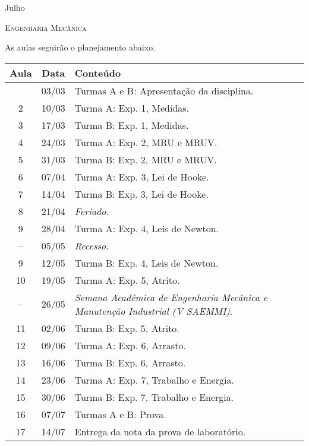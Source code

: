 \begin{marginfigure}
\centering
Julho\\
\end{marginfigure}
\vspace{1cm}
\begin{center}
\Large\textsc{Engenharia Mecânica}
\end{center}

As aulas seguirão o planejamento abaixo.
\begin{center}
\begin{longtable}{ccp{70mm}}
\toprule
Aula & Data & Conteúdo \\
\midrule
\endhead
\bottomrule
\endfoot
 1 & 03/03 & Turmas A e B: Apresentação da disciplina. \\
 2 & 10/03 & Turma A: Exp. 1, Medidas. \\
 3 & 17/03 & Turma B: Exp. 1, Medidas. \\
 4 & 24/03 & Turma A: Exp. 2, MRU e MRUV. \\ 
 5 & 31/03 & Turma B: Exp. 2, MRU e MRUV. \\
 6 & 07/04 & Turma A: Exp. 3, Lei de Hooke. \\
 7 & 14/04 & Turma B: Exp. 3, Lei de Hooke. \\
 8 & 21/04 & \emph{Feriado}. \\
 9 & 28/04 & Turma A: Exp. 4, Leis de Newton. \\
-- & 05/05 & \emph{Recesso}. \\
 9 & 12/05 & Turma B: Exp. 4, Leis de Newton. \\
10 & 19/05 & Turma A: Exp. 5, Atrito. \\
-- & 26/05 & \emph{Semana Acadêmica de Engenharia Mecânica e Manutenção Industrial (V SAEMMI)}. \\
11 & 02/06 & Turma B: Exp. 5, Atrito. \\
12 & 09/06 & Turma A: Exp. 6, Arrasto. \\
13 & 16/06 & Turma B: Exp. 6, Arrasto. \\
14 & 23/06 & Turma A: Exp. 7, Trabalho e Energia. \\
15 & 30/06 & Turma B: Exp. 7, Trabalho e Energia. \\
16 & 07/07 & Turmas A e B: Prova. \\
17 & 14/07 & Entrega da nota da prova de laboratório.
\end{longtable}
\end{center}

